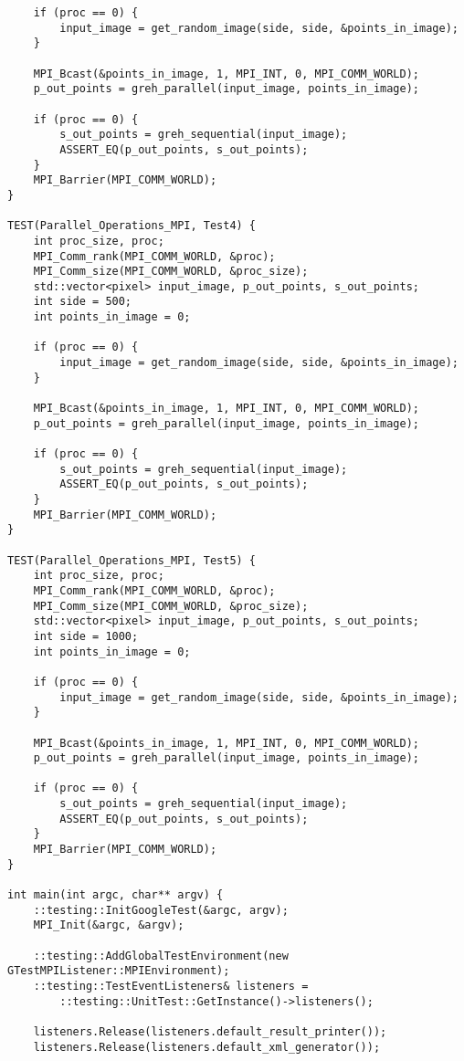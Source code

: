 \documentclass{report}
\begin{document}
\begin{lstlisting}
    if (proc == 0) {
        input_image = get_random_image(side, side, &points_in_image);
    }

    MPI_Bcast(&points_in_image, 1, MPI_INT, 0, MPI_COMM_WORLD);
    p_out_points = greh_parallel(input_image, points_in_image);

    if (proc == 0) {
        s_out_points = greh_sequential(input_image);
        ASSERT_EQ(p_out_points, s_out_points);
    }
    MPI_Barrier(MPI_COMM_WORLD);
}

TEST(Parallel_Operations_MPI, Test4) {
    int proc_size, proc;
    MPI_Comm_rank(MPI_COMM_WORLD, &proc);
    MPI_Comm_size(MPI_COMM_WORLD, &proc_size);
    std::vector<pixel> input_image, p_out_points, s_out_points;
    int side = 500;
    int points_in_image = 0;

    if (proc == 0) {
        input_image = get_random_image(side, side, &points_in_image);
    }

    MPI_Bcast(&points_in_image, 1, MPI_INT, 0, MPI_COMM_WORLD);
    p_out_points = greh_parallel(input_image, points_in_image);

    if (proc == 0) {
        s_out_points = greh_sequential(input_image);
        ASSERT_EQ(p_out_points, s_out_points);
    }
    MPI_Barrier(MPI_COMM_WORLD);
}

TEST(Parallel_Operations_MPI, Test5) {
    int proc_size, proc;
    MPI_Comm_rank(MPI_COMM_WORLD, &proc);
    MPI_Comm_size(MPI_COMM_WORLD, &proc_size);
    std::vector<pixel> input_image, p_out_points, s_out_points;
    int side = 1000;
    int points_in_image = 0;

    if (proc == 0) {
        input_image = get_random_image(side, side, &points_in_image);
    }

    MPI_Bcast(&points_in_image, 1, MPI_INT, 0, MPI_COMM_WORLD);
    p_out_points = greh_parallel(input_image, points_in_image);

    if (proc == 0) {
        s_out_points = greh_sequential(input_image);
        ASSERT_EQ(p_out_points, s_out_points);
    }
    MPI_Barrier(MPI_COMM_WORLD);
}

int main(int argc, char** argv) {
    ::testing::InitGoogleTest(&argc, argv);
    MPI_Init(&argc, &argv);

    ::testing::AddGlobalTestEnvironment(new GTestMPIListener::MPIEnvironment);
    ::testing::TestEventListeners& listeners =
        ::testing::UnitTest::GetInstance()->listeners();

    listeners.Release(listeners.default_result_printer());
    listeners.Release(listeners.default_xml_generator());


\end{lstlisting}
\end{document}

